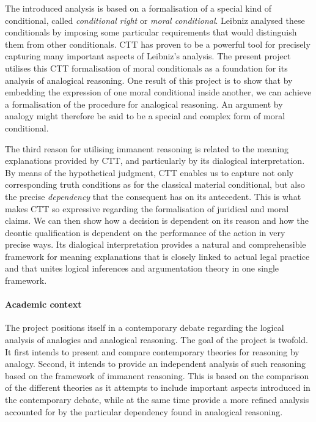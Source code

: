 			The introduced analysis is based on a formalisation of a special kind of conditional, called \textit{conditional right} or \textit{moral conditional}. Leibniz analysed these conditionals by imposing some particular requirements that would distinguish them from other conditionals. CTT has proven to be a powerful tool for precisely capturing many important aspects of Leibniz's analysis. The present project utilises this CTT formalisation of moral conditionals as a foundation for its analysis of analogical reasoning. One result of this project is to show that by embedding the expression of one moral conditional inside another, we can achieve a formalisation of the procedure for analogical reasoning. An argument by analogy might therefore be said to be a special and complex form of moral conditional. 
			
			The third reason for utilising immanent reasoning is related to the meaning explanations provided by CTT, and particularly by its dialogical interpretation. By means of the hypothetical judgment, CTT enables us to capture not only corresponding truth conditions as for the classical material conditional, but also the precise \textit{dependency} that the consequent has on its antecedent. This is what makes CTT so expressive regarding the formalisation of juridical and moral claims. We can then show how a decision is dependent on its reason and how the deontic qualification is dependent on the performance of the action in very precise ways. Its dialogical interpretation provides a natural and comprehensible framework for meaning explanations that is closely linked to actual legal practice and that unites logical inferences and argumentation theory in one single framework.  

		\paragraph{Academic context}
		
			The project positions itself in a contemporary debate regarding the logical analysis of analogies and analogical reasoning. The goal of the project is twofold. It first intends to present and compare contemporary theories for reasoning by analogy. Second, it intends to provide an independent analysis of such reasoning based on the framework of immanent reasoning. This is based on the comparison of the different theories as it attempts to include important aspects introduced in the contemporary debate, while at the same time provide a more refined analysis accounted for by the particular dependency found in analogical reasoning.
			
